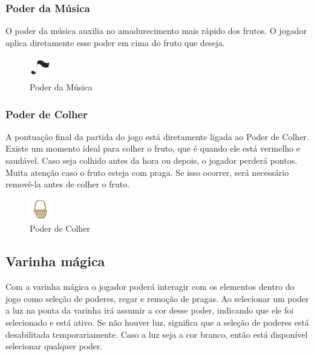 \documentclass[12pt]{article}
\begin{document}
 \subsubsection{Poder da M\'usica}
 O poder da m\'usica auxilia no amadurecimento mais r\'apido dos frutos. O jogador aplica diretamente esse poder em cima
 do fruto que deseja.
 
	\begin{figure}[ht!]
	\begin{center}
		\includegraphics[scale=1.15]{img/icone_nota_musical.png}
		\footnotesize \caption{Poder da M\'usica}
	\end{center}
	\end{figure}	

 \subsubsection{Poder de Colher}
 A pontua\c c\~ao final da partida do jogo est\'a diretamente ligada ao Poder de Colher. Existe um momento ideal para colher o
 fruto, que \'e quando ele est\'a vermelho e saud\'avel. Caso seja colhido antes da hora ou depois, o jogador perder\'a
 pontos. Muita aten\c c\~ao caso o fruto esteja com praga. Se isso ocorrer, ser\'a necess\'ario remov\^e-la antes de
 colher o fruto.
 
	\begin{figure}[ht!]
	\begin{center}
		\includegraphics[scale=1.15]{img/icone_cesta.png}
		\footnotesize \caption{Poder de Colher}
	\end{center}
	\end{figure}	

 \subsection{Varinha m\'agica}
 Com a varinha m\'agica o jogador poder\'a interagir com os elementos dentro do jogo como sele\c c\~ao de poderes, regar e remo\c c\~ao
 de pragas. Ao selecionar um poder a luz na ponta da varinha ir\'a assumir a cor desse poder, indicando que ele foi selecionado e est\'a ativo.
 Se n\~ao houver luz, significa que a sele\c c\~ao de poderes est\'a desabilitada temporariamente. Caso a luz seja a cor branco, ent\~ao
 est\'a dispon\'ivel selecionar qualquer poder.
 
\end{document}
